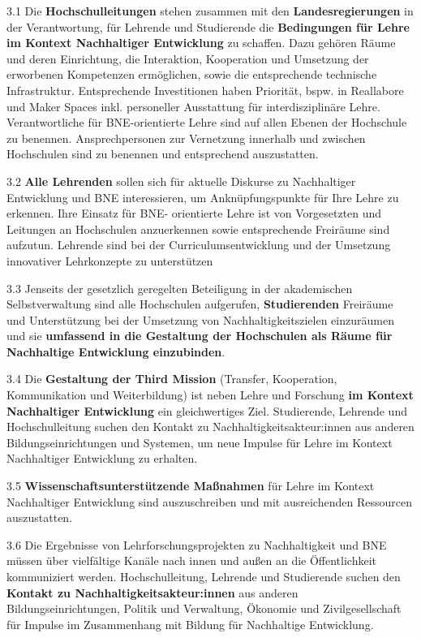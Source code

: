 \documentclass[DIV=12]{scrartcl}
\begin{document}
3.1 Die \textbf{Hochschulleitungen} stehen zusammen mit den
\textbf{Landesregierungen} in der Verantwortung, für Lehrende und
Studierende die \textbf{Bedingungen für Lehre im Kontext Nachhaltiger
Entwicklung} zu schaffen. Dazu gehören Räume und deren Einrichtung, die
Interaktion, Kooperation und Umsetzung der erworbenen Kompetenzen
ermöglichen, sowie die entsprechende technische Infrastruktur.
Entsprechende Investitionen haben Priorität, bspw. in Reallabore und
Maker Spaces inkl. personeller Ausstattung für interdisziplinäre Lehre.
Verantwortliche für BNE-orientierte Lehre sind auf allen Ebenen der
Hochschule zu benennen. Ansprechpersonen zur Vernetzung innerhalb und
zwischen Hochschulen sind zu benennen und entsprechend auszustatten.

3.2 \textbf{Alle Lehrenden} sollen sich für aktuelle Diskurse zu
Nachhaltiger Entwicklung und BNE interessieren, um Anknüpfungspunkte für
Ihre Lehre zu erkennen. Ihre Einsatz für BNE- orientierte Lehre ist von
Vorgesetzten und Leitungen an Hochschulen anzuerkennen sowie
entsprechende Freiräume sind aufzutun. Lehrende sind bei der
Curriculumsentwicklung und der Umsetzung innovativer Lehrkonzepte zu
unterstützen

3.3 Jenseits der gesetzlich geregelten Beteiligung in der akademischen
Selbstverwaltung sind alle Hochschulen aufgerufen, \textbf{Studierenden}
Freiräume und Unterstützung bei der Umsetzung von Nachhaltigkeitszielen
einzuräumen und sie \textbf{umfassend in die Gestaltung der Hochschulen
als Räume für Nachhaltige Entwicklung einzubinden}.

3.4 Die \textbf{Gestaltung der Third Mission} (Transfer, Kooperation,
Kommunikation und Weiterbildung) ist neben Lehre und Forschung
\textbf{im Kontext Nachhaltiger Entwicklung} ein gleichwertiges Ziel.
Studierende, Lehrende und Hochschulleitung suchen den Kontakt zu
Nachhaltigkeitsakteur:innen aus anderen Bildungseinrichtungen und
Systemen, um neue Impulse für Lehre im Kontext Nachhaltiger Entwicklung
zu erhalten.

3.5 \textbf{Wissenschaftsunterstützende Maßnahmen} für Lehre im Kontext
Nachhaltiger Entwicklung sind auszuschreiben und mit ausreichenden
Ressourcen auszustatten.

3.6 Die Ergebnisse von Lehrforschungsprojekten zu Nachhaltigkeit und BNE
müssen über vielfältige Kanäle nach innen und außen an die
Öffentlichkeit kommuniziert werden. Hochschulleitung, Lehrende und
Studierende suchen den \textbf{Kontakt zu Nachhaltigkeitsakteur:innen}
aus anderen Bildungseinrichtungen, Politik und Verwaltung, Ökonomie und
Zivilgesellschaft für Impulse im Zusammenhang mit Bildung für
Nachhaltige Entwicklung.
\end{document}

